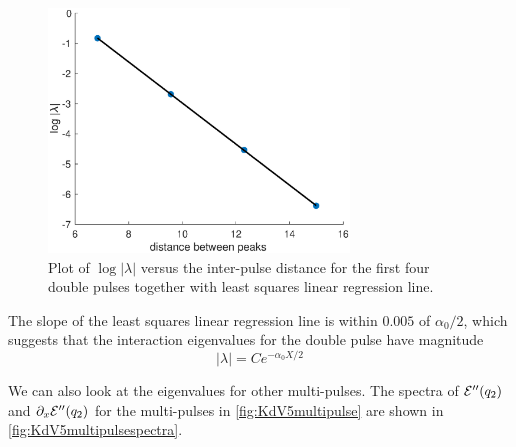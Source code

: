 \documentclass[thesis.tex]{subfiles}
\begin{document}
\begin{figure}
\begin{center}
\includegraphics[width=8cm]{images/kdv5numerics/doubleeigdecay.eps}
\caption{Plot of $\log |\lambda|$ versus the inter-pulse distance for the first four double pulses together with least squares linear regression line.}
\label{fig:KdV5doubleeigdecay}
\end{center}
\end{figure}

The slope of the least squares linear regression line is within $0.005$ of $\alpha_0/2$, which suggests that the interaction eigenvalues for the double pulse have magnitude
\[
|\lambda| = C e^{-\alpha_0 X/2}
\] 

We can also look at the eigenvalues for other multi-pulses. The spectra of $\mathcal{E}''(q_2)$ and $\partial_x \mathcal{E}''(q_2)$ for the multi-pulses in \cref{fig:KdV5multipulse} are shown in \cref{fig:KdV5multipulsespectra}. 
\end{document}
